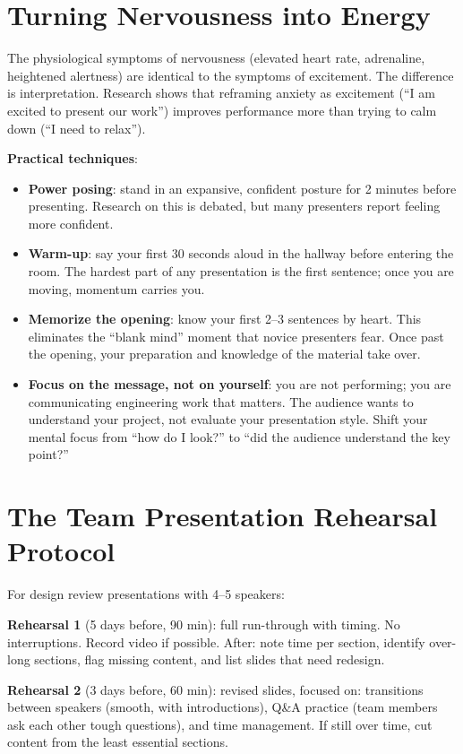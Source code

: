\section{Turning Nervousness into Energy}
The physiological symptoms of nervousness (elevated heart rate, adrenaline, heightened alertness) are identical to the symptoms of excitement. The difference is interpretation. Research shows that reframing anxiety as excitement (``I am excited to present our work'') improves performance more than trying to calm down (``I need to relax'').

\textbf{Practical techniques}:
\begin{itemize}[nosep,leftmargin=1.5em]
\item \textbf{Power posing}: stand in an expansive, confident posture for 2 minutes before presenting. Research on this is debated, but many presenters report feeling more confident.
\item \textbf{Warm-up}: say your first 30 seconds aloud in the hallway before entering the room. The hardest part of any presentation is the first sentence; once you are moving, momentum carries you.
\item \textbf{Memorize the opening}: know your first 2--3 sentences by heart. This eliminates the ``blank mind'' moment that novice presenters fear. Once past the opening, your preparation and knowledge of the material take over.
\item \textbf{Focus on the message, not on yourself}: you are not performing; you are communicating engineering work that matters. The audience wants to understand your project, not evaluate your presentation style. Shift your mental focus from ``how do I look?'' to ``did the audience understand the key point?''
\end{itemize}

\section{The Team Presentation Rehearsal Protocol}
For design review presentations with 4--5 speakers:

\textbf{Rehearsal 1} (5 days before, 90 min): full run-through with timing. No interruptions. Record video if possible. After: note time per section, identify over-long sections, flag missing content, and list slides that need redesign.

\textbf{Rehearsal 2} (3 days before, 60 min): revised slides, focused on: transitions between speakers (smooth, with introductions), Q\&A practice (team members ask each other tough questions), and time management. If still over time, cut content from the least essential sections.

